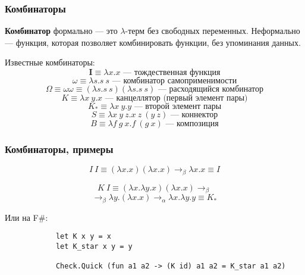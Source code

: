 \documentclass[xetex,mathserif,serif]{beamer}
\begin{document}
    \begin{frame}
        \frametitle{Комбинаторы}
        \textbf{Комбинатор} формально --- это $\lambda$-терм без свободных переменных. Неформально --- функция,
        которая позволяет комбинировать функции, без упоминания данных.
        
        Известные комбинаторы:
        $$\textbf{I} \equiv \lambda x.x \mbox{ --- тождественная функция}$$
        $$\omega \equiv \lambda s.s\ s \mbox{ --- комбинатор самоприменимости}$$
        $$\Omega \equiv \omega\omega \equiv (\lambda s.s\ s) (\lambda s.s\ s) \mbox{ --- расходящийся комбинатор}$$
        $$K \equiv \lambda x\ y.x \mbox{ --- канцеллятор (первый элемент пары)}$$
        $$K_\ast \equiv \lambda x\ y.y \mbox{ --- второй элемент пары}$$
        $$S \equiv \lambda x\ y\ z. x\ z\ (y\ z) \mbox{ --- коннектор}$$
        $$B \equiv \lambda f\ g\ x. f\ (g\ x) \mbox{ --- композиция}$$
    \end{frame}
    
    \begin{frame}[fragile]
        \frametitle{Комбинаторы, примеры}
        $$I\ I \equiv (\lambda x.x) (\lambda x.x) \rightarrow_\beta \lambda x.x \equiv I$$
                
        $$K\ I \equiv (\lambda x.\lambda y.x) (\lambda x.x) \rightarrow_\beta $$
        $$\rightarrow_\beta \lambda y.(\lambda x.x) \rightarrow_\alpha \lambda x.\lambda y.y \equiv K_\ast$$

        \vspace{1cm}
        Или на F\#:
        \begin{verbatim}
            let K x y = x
            let K_star x y = y
            
            Check.Quick (fun a1 a2 -> (K id) a1 a2 = K_star a1 a2)
        \end{verbatim}
    \end{frame}
\end{document}
